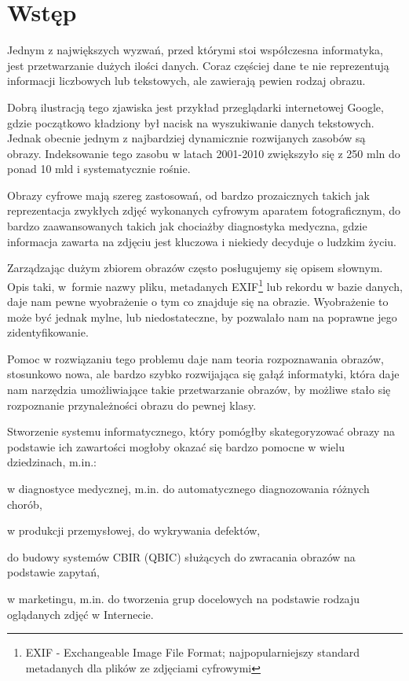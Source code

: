 \chapter*{Wstęp}

Jednym z największych wyzwań, przed którymi stoi współczesna informatyka, jest przetwarzanie dużych ilości danych. Coraz częściej dane te nie reprezentują informacji liczbowych lub tekstowych, ale zawierają pewien rodzaj obrazu. 

Dobrą ilustracją tego zjawiska jest przykład przeglądarki internetowej Google, gdzie początkowo kładziony był nacisk na wyszukiwanie danych tekstowych. Jednak obecnie jednym z najbardziej dynamicznie rozwijanych zasobów są obrazy. Indeksowanie tego zasobu w latach 2001-2010 zwiększyło się z 250 mln do ponad 10 mld i systematycznie rośnie.\cite{Google2010}

Obrazy cyfrowe mają szereg zastosowań, od bardzo prozaicznych takich jak reprezentacja zwykłych zdjęć wykonanych cyfrowym aparatem fotograficznym, do bardzo zaawansowanych takich jak chociażby diagnostyka medyczna, gdzie informacja zawarta na zdjęciu jest kluczowa i niekiedy decyduje o ludzkim życiu.

Zarządzając dużym zbiorem obrazów często posługujemy się opisem słownym. Opis taki, w~formie nazwy pliku, metadanych EXIF\footnote{EXIF - Exchangeable Image File Format; najpopularniejszy standard metadanych dla plików ze zdjęciami cyfrowymi} lub rekordu w bazie danych, daje nam pewne wyobrażenie o tym co znajduje się na obrazie. Wyobrażenie to może być jednak mylne, lub niedostateczne, by pozwalało nam na poprawne jego zidentyfikowanie.

Pomoc w rozwiązaniu tego problemu daje nam teoria rozpoznawania obrazów, stosunkowo nowa, ale bardzo szybko rozwijająca się gałąź informatyki, która daje nam narzędzia umożliwiające takie przetwarzanie obrazów, by możliwe stało się rozpoznanie przynależności obrazu do pewnej klasy.\cite{Tad91}

Stworzenie systemu informatycznego, który pomógłby skategoryzować obrazy na podstawie ich zawartości mogłoby okazać się bardzo pomocne w wielu dziedzinach, m.in.:
\begin{compactitem}
	\item w diagnostyce medycznej, m.in. do automatycznego diagnozowania różnych chorób\cite{GMM10}\cite{MONTEJO13}\cite{WARWICK10},
	\item w produkcji przemysłowej, do wykrywania defektów\cite{GLAZER08}\cite{SUVDAA2012},
	\item do budowy systemów CBIR (QBIC) służących do zwracania obrazów na podstawie zapytań\cite{LZLM06},
	\item w marketingu, m.in. do tworzenia grup docelowych na podstawie rodzaju oglądanych zdjęć w Internecie\cite{MARKETING12}.
\end{compactitem}

